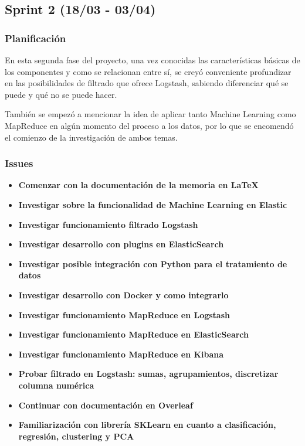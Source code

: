 \subsection{Sprint 2 (18/03 - 03/04)}
\subsubsection{Planificación}
En esta segunda fase del proyecto, una vez conocidas las características básicas de los componentes y como se relacionan entre sí, se creyó conveniente profundizar en las posibilidades de filtrado que ofrece Logstash, sabiendo diferenciar qué se puede y qué no se puede hacer.

También se empezó a mencionar la idea de aplicar tanto Machine Learning como MapReduce en algún momento del proceso a los datos, por lo que se encomendó el comienzo de la investigación de ambos temas.

\subsubsection{Issues}
\begin{itemize}
    \item \textbf{Comenzar con la documentación de la memoria en LaTeX}
    \item \textbf{Investigar sobre la funcionalidad de Machine Learning en Elastic}
    \item \textbf{Investigar funcionamiento filtrado Logstash}
    \item \textbf{Investigar desarrollo con plugins en ElasticSearch}
    \item \textbf{Investigar posible integración con Python para el tratamiento de datos}
    \item \textbf{Investigar desarrollo con Docker y como integrarlo}
    \item \textbf{Investigar funcionamiento MapReduce en Logstash}
    \item \textbf{Investigar funcionamiento MapReduce en ElasticSearch}
    \item \textbf{Investigar funcionamiento MapReduce en Kibana}
    \item \textbf{Probar filtrado en Logstash: sumas, agrupamientos, discretizar columna numérica}
    \item \textbf{Continuar con documentación en Overleaf}
    \item \textbf{Familiarización con librería SKLearn en cuanto a clasificación, regresión, clustering y PCA}
\end{itemize}

